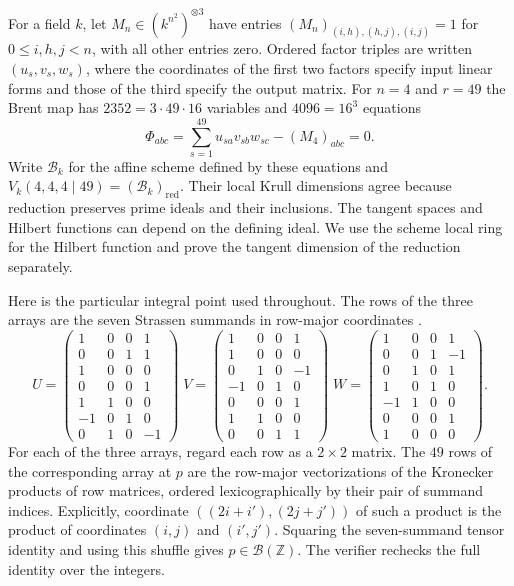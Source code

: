 \documentclass[11pt]{amsart}
\newcommand{\Z}{\mathbb Z}
\newcommand{\Br}{\mathcal B}
\begin{document}
For a field $k$, let $M_n\in(k^{n^2})^{\otimes3}$ have entries
$(M_n)_{(i,h),(h,j),(i,j)}=1$ for $0\le i,h,j<n$, with all other
entries zero. Ordered factor triples are written $(u_s,v_s,w_s)$,
where the coordinates of the first two factors specify input linear
forms and those of the third specify the output matrix. For $n=4$
and $r=49$ the Brent map has $2352=3\cdot49\cdot16$ variables and
$4096=16^3$ equations
\begin{equation}\label{eq:brent}
 \Phi_{abc}=\sum_{s=1}^{49}u_{sa}v_{sb}w_{sc}-(M_4)_{abc}=0.
\end{equation}
Write $\Br_k$ for the affine scheme defined by these equations and
$V_k(4,4,4\mid49)=(\Br_k)_{\mathrm{red}}$. Their local Krull dimensions
agree because reduction preserves prime ideals and their inclusions.
The tangent spaces and Hilbert functions can depend on the defining
ideal. We use the scheme local ring for the Hilbert function and
prove the tangent dimension of the reduction separately.

Here is the particular integral point used throughout. The rows
of the three arrays are the seven Strassen summands in row-major
coordinates \cite{strassen}.
\[
 U=\begin{pmatrix}
 1&0&0&1\\0&0&1&1\\1&0&0&0\\0&0&0&1\\1&1&0&0\\-1&0&1&0\\0&1&0&-1
 \end{pmatrix}\;
 V=\begin{pmatrix}
 1&0&0&1\\1&0&0&0\\0&1&0&-1\\-1&0&1&0\\0&0&0&1\\1&1&0&0\\0&0&1&1
 \end{pmatrix}\;
 W=\begin{pmatrix}
 1&0&0&1\\0&0&1&-1\\0&1&0&1\\1&0&1&0\\-1&1&0&0\\0&0&0&1\\1&0&0&0
 \end{pmatrix}.
\]
For each of the three arrays, regard each row as a $2\times2$ matrix.
The $49$ rows of the corresponding array at $p$ are the row-major
vectorizations of the Kronecker products of row matrices, ordered
lexicographically by their pair of summand indices. Explicitly,
coordinate $((2i+i'),(2j+j'))$ of such a product is the product of
coordinates $(i,j)$ and $(i',j')$. Squaring the seven-summand tensor
identity and using this shuffle gives $p\in\Br(\Z)$. The verifier
rechecks the full identity over the integers.
\end{document}
